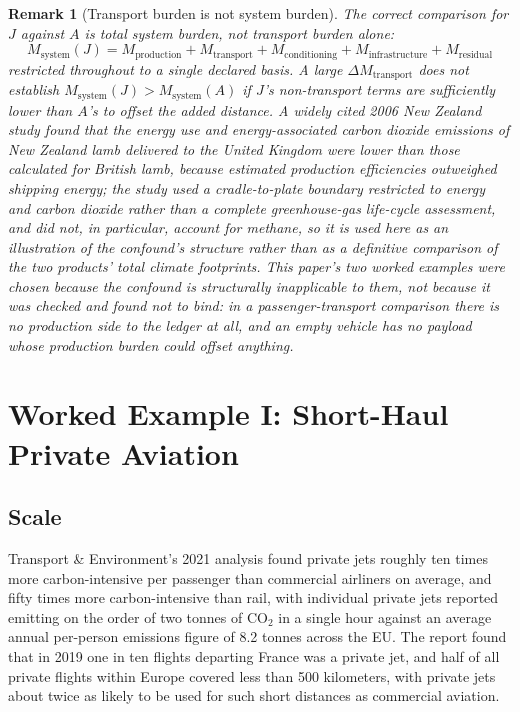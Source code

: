 \documentclass[11pt]{article}
\newtheorem{remark}[definition]{Remark}
\begin{document}
\begin{remark}[Transport burden is not system burden]
The correct comparison for $J$ against $A$ is total system burden, not transport burden alone:
\[
M_{\text{system}}(J) = M_{\text{production}} + M_{\text{transport}} + M_{\text{conditioning}} + M_{\text{infrastructure}} + M_{\text{residual}}
\]
restricted throughout to a single declared basis. A large $\Delta M_{\text{transport}}$ does not establish $M_{\text{system}}(J) > M_{\text{system}}(A)$ if $J$'s non-transport terms are sufficiently lower than $A$'s to offset the added distance. A widely cited 2006 New Zealand study found that the energy use and energy-associated carbon dioxide emissions of New Zealand lamb delivered to the United Kingdom were lower than those calculated for British lamb, because estimated production efficiencies outweighed shipping energy; the study used a cradle-to-plate boundary restricted to energy and carbon dioxide rather than a complete greenhouse-gas life-cycle assessment, and did not, in particular, account for methane, so it is used here as an illustration of the confound's structure rather than as a definitive comparison of the two products' total climate footprints. This paper's two worked examples were chosen because the confound is structurally inapplicable to them, not because it was checked and found not to bind: in a passenger-transport comparison there is no production side to the ledger at all, and an empty vehicle has no payload whose production burden could offset anything.
\end{remark}

\section{Worked Example I: Short-Haul Private Aviation}

\subsection{Scale}

Transport \& Environment's 2021 analysis found private jets roughly ten times more carbon-intensive per passenger than commercial airliners on average, and fifty times more carbon-intensive than rail, with individual private jets reported emitting on the order of two tonnes of CO$_2$ in a single hour against an average annual per-person emissions figure of 8.2 tonnes across the EU. The report found that in 2019 one in ten flights departing France was a private jet, and half of all private flights within Europe covered less than 500 kilometers, with private jets about twice as likely to be used for such short distances as commercial aviation.
\end{document}
